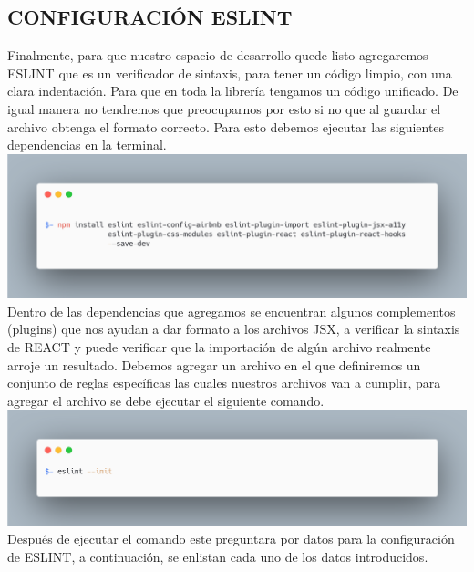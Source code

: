 \subsection{CONFIGURACIÓN ESLINT }
Finalmente, para que nuestro espacio de desarrollo quede listo agregaremos ESLINT que es un verificador de sintaxis, para tener un código limpio, con una clara indentación. Para que en toda la librería tengamos un código unificado. De igual manera no tendremos que preocuparnos por esto si no que al guardar el archivo obtenga el formato correcto.
Para esto debemos ejecutar las siguientes dependencias en la terminal.
\newline
\newline
\includegraphics[width=1\textwidth]{./Imagenes/image14.png}
\newline
Dentro de las dependencias que agregamos se encuentran algunos complementos (plugins) que nos ayudan a dar formato a los archivos JSX, a verificar la sintaxis de REACT y  puede verificar que la importación de algún archivo realmente arroje un resultado.
Debemos agregar un archivo en el que definiremos un conjunto de reglas específicas las cuales nuestros archivos van a cumplir, para agregar el archivo se debe ejecutar el siguiente comando.
\newline
\includegraphics[width=1\textwidth]{./Imagenes/image32.png}
\newline
Después de ejecutar el comando este preguntara por datos para la configuración de ESLINT, a continuación, se enlistan cada uno de los datos introducidos.
